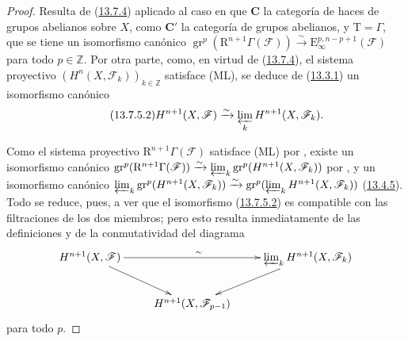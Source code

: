 \begin{proof}
Resulta de (\hyperref[0.13.7.4-fr]{13.7.4}) aplicado al caso en que $\boldsymbol{C}$ la categoría de haces de
grupos abelianos sobre $X$, como $\boldsymbol{C}'$ la categoría de grupos abelianos,
y $\mathrm T=\Gamma$, que se tiene un isomorfismo
canónico
$\operatorname{gr}^p(\mathrm R^{n+1}\Gamma(\boldsymbol{\mathcal F}))
\xrightarrow{\sim}\mathrm E_\infty^{p,n-p+1}(\boldsymbol{\mathcal F})$ para todo $p\in\mathbb Z$. Por otra parte, como, en virtud de (\hyperref[0.13.7.4-fr]{13.7.4}), el sistema proyectivo $(H^n(X,\mathcal F_k))_{k\in\mathbb Z}$ satisface (ML), se deduce de (\hyperref[0.13.3.1-fr]{13.3.1}) un isomorfismo canónico
\hypertarget{canon-legacy.0-III.13.7.5.proof-comparison}{}
\[
\label{0.13.7.5.1b-fr}
\tag{13.7.5.2}
H^{n+1}(X,\mathcal F)\xrightarrow{\sim}
\varprojlim_k H^{n+1}(X,\mathcal F_k).
\]

Como el sistema proyectivo
$\mathrm R^{n+1}\Gamma(\boldsymbol{\mathcal F})$ satisface {\rm(ML)} por
, existe un isomorfismo canónico
$\operatorname{gr}^p(\mathrm R^{n+1}\Gamma(\boldsymbol{\mathcal F}))
\xrightarrow{\sim}
\varprojlim_k\operatorname{gr}^p(H^{n+1}(X,\mathcal F_k))$
por , y un isomorfismo canónico
$\varprojlim_k\operatorname{gr}^p(H^{n+1}(X,\mathcal F_k))
\xrightarrow{\sim}
\operatorname{gr}^p(\varprojlim_k H^{n+1}(X,\mathcal F_k))$
(\hyperref[0.13.4.5-fr]{13.4.5}). Todo se reduce, pues, a ver que el isomorfismo (\hyperref[0.13.7.5.1b-fr]{13.7.5.2}) es compatible con las filtraciones de los dos miembros; pero esto resulta inmediatamente de las definiciones y de la conmutatividad del diagrama
\[
\xymatrix{
H^{n+1}(X,\mathcal F)\ar[rr]^{\sim}\ar[dr]
&&\varprojlim_k H^{n+1}(X,\mathcal F_k)\ar[dl]\\
&H^{n+1}(X,\mathcal F_{p-1})&
}
\]
para todo $p$.
\end{proof}

